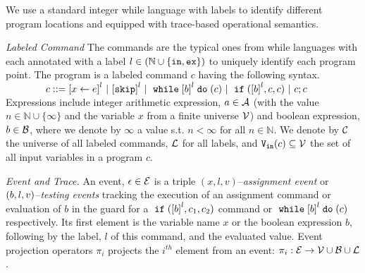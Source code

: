 We use a standard integer while language with labels to identify different program locations and equipped with trace-based operational semantics.

\emph{Labeled Command}
The commands are the typical ones from while languages with each annotated with a label $l \in (\mathbb{N} \cup \{\mathtt{in}, \mathtt{ex}\})$ to uniquely identify each program point. The program is a labeled command $c$ having the following syntax. 
\\
$ \qquad \qquad
{c} ::= 
\clabel{\assign{x}{\expr}}^l 
~|~ \clabel{\eskip}^l
~|~ \ewhile \clabel{\bexpr}^{l} \edo ({c})
~|~ \eif(\clabel{\bexpr}^{l} , {c}, {c}) 
~|~ {c};{c} 
$
\\
Expressions include
integer arithmetic expression, $a \in \mathcal{A}$ (with the value $n \in \mathbb{N} \cup \{ \infty\}$ and the variable $x$ from a finite universe $\mathcal{V}$) and boolean expression, $b \in \mathcal{B}$, where we denote by $\infty$ a value s.t. $n < \infty $ for all $n \in \mathbb{N}$.
We denote by $\mathcal{C}$ the universe of all labeled commands, $\mathcal{L}$ for all labels, and
${\mathtt{V_{\mathtt{in}}}}(c) \subseteq \mathcal{V}$ the set of all input variables in a program $c$.


\emph{Event and Trace.}
An event, $\mathtt{\epsilon} \in \mathcal{E}$ is a triple $({x}, l, v)$--\emph{assignment event} or $(b, l, v)$--\emph{testing events} tracking the execution of an assignment command or evaluation of $b$ in
the guard for a $\eif(\clabel{b}^l, c_1, c_2)$ command or $\ewhile \clabel{b}^l \edo (c)$ respectively.
Its first element is the variable name $x$
or the boolean expression $b$, 
following by 
the label, $l$ of this command, and the evaluated value.
Event projection operators $\pi_i$ projects the $i^{th}$ element from an event: 
$\pi_i : \mathcal{E} \to \mathcal{V} \cup \mathcal{B} \cup \mathcal{L} $.


